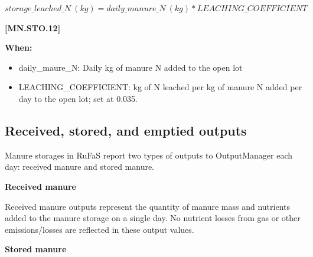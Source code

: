 \begin{refsection}
    \begin{center}
        \(storage\_leached\_N\ (kg) = daily\_manure\_N\ (kg)  * LEACHING\_COEFFICIENT\)
    \end{center}
        \vspace{0.5cm} 
    
            {\raggedleft \textbf{[MN.STO.12]}\par}
            \vspace{0.5cm} 
            
    \textbf{When:}

    \begin{itemize}
        \item daily\_maure\_N: Daily kg of manure N added to the open lot
        \item LEACHING\_COEFFICIENT: kg of N leached per kg of manure N added per day to the open lot; set at 0.035.
    \end{itemize}
    \vspace{0.5cm}


\subsection{Received, stored, and emptied outputs}
\vspace{0.2cm}

Manure storages in RuFaS report two types of outputs to OutputManager each day: received manure and stored manure. 
\vspace{0.2cm}

\textbf{Received manure}
\vspace{ 0.25cm}

Received manure outputs represent the quantity of manure mass and nutrients added to the manure storage on a single day. No nutrient losses from gas or other emissions/losses are reflected in these output values. 
\vspace{0.2cm}

\textbf{Stored manure}
\vspace{ 0.25cm}


\end{refsection}
